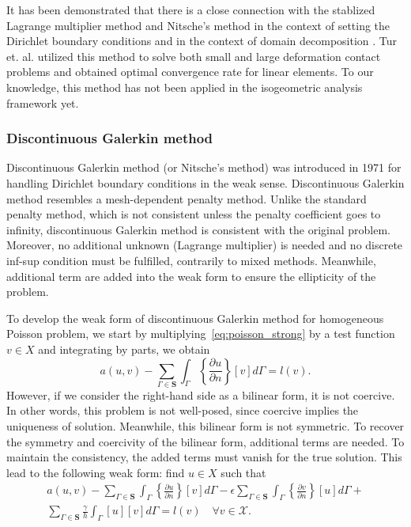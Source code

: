 \documentclass[preprint,12pt]{elsarticle}
\theoremstyle{remark}
\begin{document}
It has been demonstrated that there is a close connection with the stablized Lagrange multiplier method and Nitsche's method in the context of setting the Dirichlet boundary conditions \cite{stenberg1995some} and in the context of domain decomposition \cite{hansbo2005lagrange, hansbo_nitsches_2005, juntunen2015connection}. Tur et. al. \cite{tur2015modified} utilized this method to solve both small and large deformation contact problems and obtained optimal convergence rate for linear elements. To our knowledge, this method has not been applied in the isogeometric analysis framework yet.
\subsubsection{Discontinuous Galerkin method}
Discontinuous Galerkin method (or Nitsche's method) was introduced in 1971 \cite{nitsche_uber_1971} for handling Dirichlet boundary conditions in the weak sense. Discontinuous Galerkin method resembles a mesh-dependent penalty method. Unlike the standard penalty method, which is not consistent unless the penalty coefficient goes to infinity, discontinuous Galerkin method is consistent with the original problem. Moreover, no additional unknown (Lagrange multiplier) is needed and no discrete inf-sup condition must be fulfilled, contrarily to mixed methods. Meanwhile, additional term are added into the weak form to ensure the ellipticity of the problem.\par
To develop the weak form of discontinuous Galerkin method for homogeneous Poisson problem, we start by multiplying~\eqref{eq:poisson_strong} by a test function $v\in{X}$ and integrating by parts, we obtain
\begin{equation}
    a(u,v)-\sum_{\Gamma\in\mathbf{S}}\int_\Gamma\left\{\frac{\partial{u}}{\partial{n}}\right\}\left[v\right]d\Gamma=l(v).\label{eq:origin_discontinuous_galerkin}
\end{equation}
However, if we consider the right-hand side as a bilinear form, it is not coercive. In other words, this problem is not well-posed, since coercive implies the uniqueness of solution. Meanwhile, this bilinear form is not symmetric. To recover the symmetry and coercivity of the bilinear form, additional terms are needed. To maintain the consistency, the added terms must vanish for the true solution. This lead to the following weak form: find $u\in{X}$ such that
\begin{equation}
\begin{split}
    a(u,v)-\sum_{\Gamma\in\mathbf{S}}\int_\Gamma\left\{\frac{\partial{u}}{\partial{n}}\right\}\left[v\right]d\Gamma-\epsilon\sum_{\Gamma\in\mathbf{S}}\int_\Gamma\left\{\frac{\partial{v}}{\partial{n}}\right\}\left[u\right]d\Gamma+\\
    \sum_{\Gamma\in\mathbf{S}}\frac{\gamma}{h}\int_\Gamma\left[u\right]\left[v\right]d\Gamma=l(v)\quad \forall v\in{\mathcal{X}}.
\end{split}
\end{equation}
\end{document}
